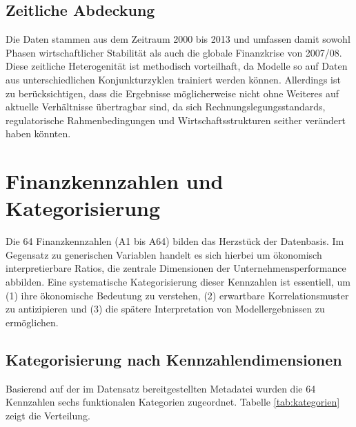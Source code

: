 \subsection{Zeitliche Abdeckung}

Die Daten stammen aus dem Zeitraum 2000 bis 2013 und umfassen damit sowohl Phasen wirtschaftlicher Stabilität als auch die globale Finanzkrise von 2007/08. Diese zeitliche Heterogenität ist methodisch vorteilhaft, da Modelle so auf Daten aus unterschiedlichen Konjunkturzyklen trainiert werden können. Allerdings ist zu berücksichtigen, dass die Ergebnisse möglicherweise nicht ohne Weiteres auf aktuelle Verhältnisse übertragbar sind, da sich Rechnungslegungsstandards, regulatorische Rahmenbedingungen und Wirtschaftsstrukturen seither verändert haben könnten.

\section{Finanzkennzahlen und Kategorisierung}

Die 64 Finanzkennzahlen (A1 bis A64) bilden das Herzstück der Datenbasis. Im Gegensatz zu generischen Variablen handelt es sich hierbei um ökonomisch interpretierbare Ratios, die zentrale Dimensionen der Unternehmensperformance abbilden. Eine systematische Kategorisierung dieser Kennzahlen ist essentiell, um (1) ihre ökonomische Bedeutung zu verstehen, (2) erwartbare Korrelationsmuster zu antizipieren und (3) die spätere Interpretation von Modellergebnissen zu ermöglichen.

\subsection{Kategorisierung nach Kennzahlendimensionen}

Basierend auf der im Datensatz bereitgestellten Metadatei wurden die 64 Kennzahlen sechs funktionalen Kategorien zugeordnet. Tabelle \ref{tab:kategorien} zeigt die Verteilung.

